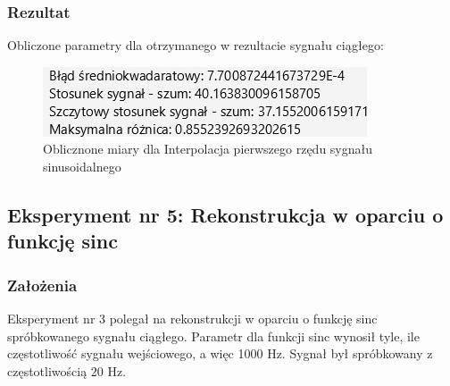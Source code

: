 \documentclass[12pt]{article}
\begin{document}
\subsubsection{Rezultat}
Obliczone parametry dla otrzymanego w rezultacie sygnału ciągłego:
\begin{figure}[H]
	\centering
	\includegraphics[width=\linewidth]{wyniki_interpolacja_pierwszy.jpg}
	\caption{Oblicznone miary dla Interpolacja pierwszego rzędu sygnału sinusoidalnego}
	\label{wartości dla eksperymentu 4}
\end{figure}


\newpage
\subsection{Eksperyment nr 5: Rekonstrukcja w oparciu o funkcję sinc }
\subsubsection{Założenia}
Eksperyment nr 3 polegał na rekonstrukcji w oparciu o funkcję sinc spróbkowanego sygnału ciągłego. Parametr dla funkcji sinc wynosił tyle, ile częstotliwość sygnału wejściowego, a więc 1000 Hz. Sygnał był spróbkowany z częstotliwością 20 Hz.
\end{document}
